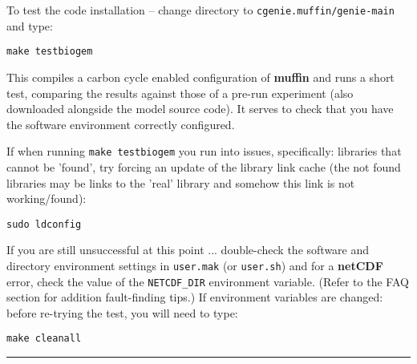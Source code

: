 \documentclass[10pt,twoside]{article}
\begin{document}
\vspace{2mm}

\noindent To test the code installation -- change directory to \texttt{cgenie.muffin/genie-main} and type:
\vspace{-5pt}\begin{verbatim}
make testbiogem
\end{verbatim}\vspace{-5pt}
This compiles a carbon cycle enabled configuration of \textbf{muffin} and runs a short test, comparing the results against those of a pre-run experiment (also downloaded alongside the model source code). It serves to check that you have the software environment correctly configured. 

\vspace{2mm}

\noindent If when running \texttt{make testbiogem} you run into issues, specifically: libraries that cannot be 'found', try forcing an update of the library link cache (the not found libraries may be links to the 'real' library and somehow this link is not working/found):
\vspace{-2pt}
\begin{verbatim}
sudo ldconfig
\end{verbatim}

If you are still unsuccessful at this point ... double-check the software and directory environment settings in \texttt{user.mak} (or \texttt{user.sh}) and for a \textbf{netCDF} error, check the value of the \texttt{NETCDF\_DIR} environment variable. (Refer to the FAQ section for addition fault-finding tips.) If environment variables are changed: before re-trying the test, you will need to type:
\vspace{-5pt}\begin{verbatim}
make cleanall
\end{verbatim}\vspace{-5pt}

\vspace{1mm}\noindent\rule{4cm}{0.2mm}

\end{document}
